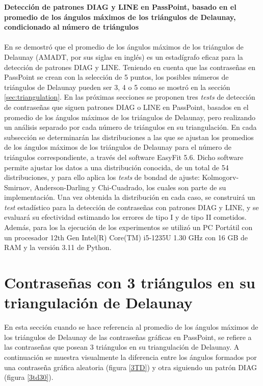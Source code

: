 \documentclass[12pt]{report}
\begin{document}
\vspace{-2em} %

\noindent\textbf{\LARGE Detección de patrones DIAG y LINE en PassPoint, basado en el promedio de los ángulos máximos de los triángulos de Delaunay, condicionado al número de triángulos}\\
\vspace{2em}
\\	
En \cite{13} se demostró que el promedio de los ángulos máximos de los triángulos de Delaunay (AMADT, por sus siglas en inglés) es un estadígrafo eficaz para la detección de patrones DIAG y LINE. Teniendo en cuenta que las contraseñas en PassPoint se crean con la selección de 5 puntos, los posibles números de triángulos de Delaunay pueden ser 3, 4 o 5 como se mostró en la sección \ref{sec:triangulation}. En las próximas secciones se proponen tres \textit{tests} de detección de contraseñas  que siguen patrones DIAG o LINE en PassPoint, basados en el promedio de los ángulos  máximos de los triángulos de Delaunay, pero  realizando un análisis separado por cada número de triángulos en su triangulación.
En cada subsección se determinarán las distribuciones a las que se ajustan los promedios de los ángulos máximos de los triángulos de Delaunay para el número de triángulos correspondiente, a través  del software EasyFit 5.6. Dicho software permite ajustar los datos a una distribución conocida, de un total de 54 distribuciones, y para ello aplica los \textit{tests} de bondad de ajuste: Kolmogorv-Smirnov, Anderson-Darling y Chi-Cuadrado, los cuales son parte de su implementación. 
Una vez obtenida la distribución en cada caso, se construirá un \textit{test} estadístico para la detección de contraseñas con patrones DIAG y LINE, y se evaluará su efectividad estimando los errores de  tipo I y de tipo II cometidos. Además, para los la ejecución de los experimentos se utilizó un PC Portátil con un procesador  12th Gen Intel(R) Core(TM) i5-1235U  1.30 GHz  con 16 GB de RAM y la versión 3.11 de Python.



\setcounter{section}{0}
\section{Contraseñas con 3 triángulos en su triangulación de Delaunay }
\label{sec:1}
En esta sección cuando se hace referencia  al promedio de los ángulos máximos de los triángulos de Delaunay  de las contraseñas gráficas en PassPoint, se refiere a las contraseñas que posean 3 triángulos en su triangulación de Delaunay. A continuación se muestra visualmente la diferencia entre los ángulos formados por una contraseña gráfica aleatoria (figura \ref{3TD}) y otra siguiendo un patrón DIAG (figura \ref{3td30}).
\newpage
	
\end{document}
